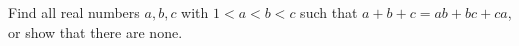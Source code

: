 Find all real numbers $a,b,c$ with $1<a<b<c$ such that $a+b+c=ab+bc+ca$, or show that there are none.
